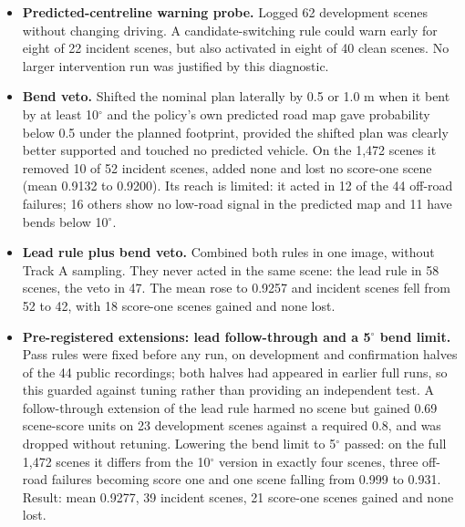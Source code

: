 \begin{itemize}
\item \textbf{Predicted-centreline warning probe.} Logged 62 development scenes without changing driving. A candidate-switching rule could warn early for eight of 22 incident scenes, but also activated in eight of 40 clean scenes. No larger intervention run was justified by this diagnostic.
\item \textbf{Bend veto.} Shifted the nominal plan laterally by 0.5 or 1.0 m when it bent by at least 10$^\circ$ and the policy's own predicted road map gave probability below 0.5 under the planned footprint, provided the shifted plan was clearly better supported and touched no predicted vehicle. On the 1,472 scenes it removed 10 of 52 incident scenes, added none and lost no score-one scene (mean 0.9132 to 0.9200). Its reach is limited: it acted in 12 of the 44 off-road failures; 16 others show no low-road signal in the predicted map and 11 have bends below 10$^\circ$.
\item \textbf{Lead rule plus bend veto.} Combined both rules in one image, without Track A sampling. They never acted in the same scene: the lead rule in 58 scenes, the veto in 47. The mean rose to 0.9257 and incident scenes fell from 52 to 42, with 18 score-one scenes gained and none lost.
\item \textbf{Pre-registered extensions: lead follow-through and a 5$^\circ$ bend limit.} Pass rules were fixed before any run, on development and confirmation halves of the 44 public recordings; both halves had appeared in earlier full runs, so this guarded against tuning rather than providing an independent test. A follow-through extension of the lead rule harmed no scene but gained 0.69 scene-score units on 23 development scenes against a required 0.8, and was dropped without retuning. Lowering the bend limit to 5$^\circ$ passed: on the full 1,472 scenes it differs from the 10$^\circ$ version in exactly four scenes, three off-road failures becoming score one and one scene falling from 0.999 to 0.931. Result: mean 0.9277, 39 incident scenes, 21 score-one scenes gained and none lost.

\end{itemize}

